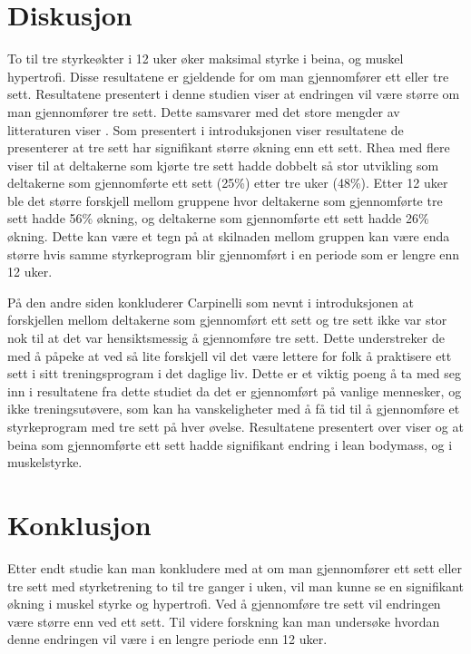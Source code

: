 \documentclass[
]{book}
\begin{document}
\hypertarget{diskusjon-1}{%
\section{Diskusjon}\label{diskusjon-1}}

To til tre styrkeøkter i 12 uker øker maksimal styrke i beina, og muskel hypertrofi. Disse resultatene er gjeldende for om man gjennomfører ett eller tre sett. Resultatene presentert i denne studien viser at endringen vil være større om man gjennomfører tre sett. Dette samsvarer med det store mengder av litteraturen viser \citep{rhea2002, munn2005, fröhlich2010}. Som presentert i introduksjonen viser resultatene de presenterer at tre sett har signifikant større økning enn ett sett. Rhea med flere viser til at deltakerne som kjørte tre sett hadde dobbelt så stor utvikling som deltakerne som gjennomførte ett sett (25\%) etter tre uker (48\%). Etter 12 uker ble det større forskjell mellom gruppene hvor deltakerne som gjennomførte tre sett hadde 56\% økning, og deltakerne som gjennomførte ett sett hadde 26\% økning. Dette kan være et tegn på at skilnaden mellom gruppen kan være enda større hvis samme styrkeprogram blir gjennomført i en periode som er lengre enn 12 uker.

På den andre siden konkluderer Carpinelli \citep{carpinelli1998} som nevnt i introduksjonen at forskjellen mellom deltakerne som gjennomført ett sett og tre sett ikke var stor nok til at det var hensiktsmessig å gjennomføre tre sett. Dette understreker de med å påpeke at ved så lite forskjell vil det være lettere for folk å praktisere ett sett i sitt treningsprogram i det daglige liv. Dette er et viktig poeng å ta med seg inn i resultatene fra dette studiet da det er gjennomført på vanlige mennesker, og ikke treningsutøvere, som kan ha vanskeligheter med å få tid til å gjennomføre et styrkeprogram med tre sett på hver øvelse. Resultatene presentert over viser og at beina som gjennomførte ett sett hadde signifikant endring i lean bodymass, og i muskelstyrke.

\hypertarget{konklusjon}{%
\section{Konklusjon}\label{konklusjon}}

Etter endt studie kan man konkludere med at om man gjennomfører ett sett eller tre sett med styrketrening to til tre ganger i uken, vil man kunne se en signifikant økning i muskel styrke og hypertrofi. Ved å gjennomføre tre sett vil endringen være større enn ved ett sett. Til videre forskning kan man undersøke hvordan denne endringen vil være i en lengre periode enn 12 uker.

  
\end{document}
